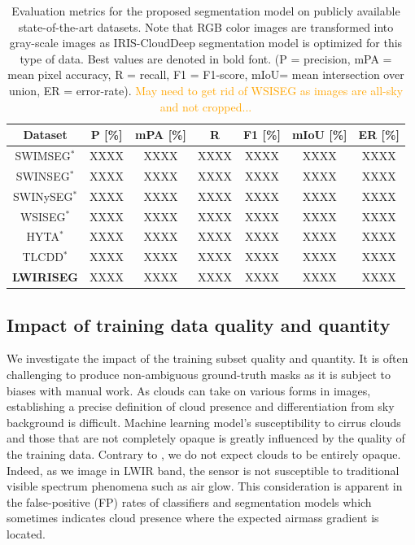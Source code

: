 \documentclass[amt, article]{copernicus}
\begin{document}
\begin{table}[t]
    \begin{center}
        \caption{Evaluation metrics for the proposed segmentation model on publicly available state-of-the-art datasets. Note that RGB color images are transformed into gray-scale images as IRIS-CloudDeep segmentation model is optimized for this type of data. Best values are denoted in bold font. (P = precision, mPA = mean pixel accuracy, R = recall, F1 = F1-score, mIoU= mean intersection over union, ER = error-rate). \textcolor{orange}{May need to get rid of WSISEG as images are all-sky and not cropped...}}
        \begin{tabular}{c c c c c c c} 
        \tophline \hline
         Dataset & P [\%] & mPA [\%] & R & F1 [\%] & mIoU [\%] & ER [\%] \\ [1.0ex]
         \hline
         SWIMSEG$^{*}$ & XXXX & XXXX & XXXX & XXXX & XXXX & XXXX \\ [1.0ex]
         SWINSEG$^{*}$ & XXXX & XXXX & XXXX & XXXX & XXXX & XXXX \\ [1.0ex]
         SWINySEG$^{*}$ & XXXX & XXXX & XXXX & XXXX & XXXX & XXXX \\ [1.0ex]
         WSISEG$^{*}$ & XXXX & XXXX & XXXX & XXXX & XXXX & XXXX \\ [1.0ex]
         HYTA$^{*}$ & XXXX & XXXX & XXXX & XXXX & XXXX & XXXX \\ [1.0ex]
         TLCDD$^{*}$ & XXXX & XXXX & XXXX & XXXX & XXXX & XXXX \\ [1.0ex]
         \textbf{LWIRISEG} & XXXX & XXXX & XXXX & XXXX & XXXX & XXXX \\
         \hline
        \end{tabular}
        \label{tab:datasets_comparison}
        \end{center}
    \end{table}


\subsection{Impact of training data quality and quantity}

We investigate the impact of the training subset quality and quantity.
It is often challenging to produce non-ambiguous ground-truth masks as it is subject to biases with manual work. As clouds can take on various forms in images, establishing a precise definition of cloud presence and differentiation from sky background is difficult. Machine learning model's susceptibility to cirrus clouds and those that are not completely opaque is greatly influenced by the quality of the training data. Contrary to \cite{Mommert2020}, we do not expect clouds to be entirely opaque. Indeed, as we image in LWIR band, the sensor is not susceptible to traditional visible spectrum phenomena such as air glow. This consideration is apparent in the false-positive (FP) rates of classifiers and segmentation models which sometimes indicates cloud presence where the expected airmass gradient is located.
\end{document}
